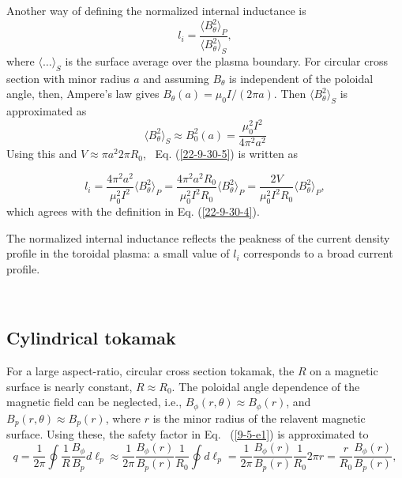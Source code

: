 \documentclass{llncs}
\begin{document}
Another way of defining the normalized internal inductance is
\begin{equation}
  \label{22-9-30-5} l_i = \frac{\langle B_{\theta}^2 \rangle_P}{\langle
  B_{\theta}^2 \rangle_S},
\end{equation}
where $\langle \ldots \rangle_S$ is the surface average over the plasma
boundary. For circular cross section with minor radius $a$ and assuming
$B_{\theta}$ is independent of the poloidal angle, then, Ampere's law gives
$B_{\theta} (a) = \mu_0 I / (2 \pi a)$. Then $\langle B_{\theta}^2 \rangle_S$
is approximated as
\begin{equation}
  \langle B_{\theta}^2 \rangle_S \approx B_0^2 (a) = \frac{\mu_0^2 I^2}{4
  \pi^2 a^2}
\end{equation}
Using this and $V \approx \pi a^2 2 \pi R_0$, \ Eq. (\ref{22-9-30-5}) is
written as


\begin{equation}
  l_i = \frac{4 \pi^2 a^2}{\mu_0^2 I^2} \langle B_{\theta}^2 \rangle_P =
  \frac{4 \pi^2 a^2 R_0}{\mu_0^2 I^2 R_0} \langle B_{\theta}^2 \rangle_P =
  \frac{2 V}{\mu_0^2 I^2 R_0} \langle B_{\theta}^2 \rangle_P,
\end{equation}
which agrees with the definition in Eq. (\ref{22-9-30-4}).

The normalized internal inductance reflects the peakness of the current
density profile in the toroidal plasma: a small value of $l_i$ corresponds to
a broad current profile.

\

\subsection{Cylindrical tokamak}

For a large aspect-ratio, circular cross section tokamak, the $R$ on a
magnetic surface is nearly constant, $R \approx R_0$. The poloidal angle
dependence of the magnetic field can be neglected, i.e., $B_{\phi} (r, \theta)
\approx B_{\phi} (r)$, and $B_p (r, \theta) \approx B_p (r)$, where $r$ is the
minor radius of the relavent magnetic surface. Using these, the safety factor
in Eq. \ (\ref{9-5-e1}) is approximated to
\begin{equation}
  q = \frac{1}{2 \pi} \oint \frac{1}{R} \frac{B_{\phi}}{B_p} d \ell_p \approx
  \frac{1}{2 \pi} \frac{B_{\phi} (r)}{B_p (r)}  \frac{1}{R_0} \oint d \ell_p =
  \frac{1}{2 \pi} \frac{B_{\phi} (r)}{B_p (r)}  \frac{1}{R_0} 2 \pi r =
  \frac{r}{R_0}  \frac{B_{\phi} (r)}{B_p (r)},
\end{equation}
\end{document}
